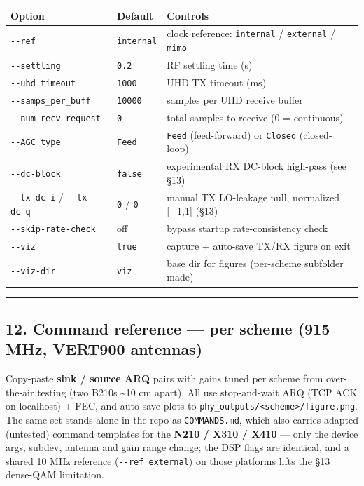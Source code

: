 \documentclass[
  10pt,
]{article}
\begin{document}
\begin{longtable}[]{@{}lll@{}}
\toprule
Option & Default & Controls \\
\midrule
\endhead
\texttt{-\/-ref} & \texttt{internal} & clock reference:
\texttt{internal} / \texttt{external} / \texttt{mimo} \\
\texttt{-\/-settling} & \texttt{0.2} & RF settling time (s) \\
\texttt{-\/-uhd\_timeout} & \texttt{1000} & UHD TX timeout (ms) \\
\texttt{-\/-samps\_per\_buff} & \texttt{10000} & samples per UHD receive
buffer \\
\texttt{-\/-num\_recv\_request} & \texttt{0} & total samples to receive
(0 = continuous) \\
\texttt{-\/-AGC\_type} & \texttt{Feed} & \texttt{Feed} (feed-forward) or
\texttt{Closed} (closed-loop) \\
\texttt{-\/-dc-block} & \texttt{false} & experimental RX DC-block
high-pass (see §13) \\
\texttt{-\/-tx-dc-i} / \texttt{-\/-tx-dc-q} & \texttt{0} / \texttt{0} &
manual TX LO-leakage null, normalized {[}−1,1{]} (§13) \\
\texttt{-\/-skip-rate-check} & off & bypass startup rate-consistency
check \\
\texttt{-\/-viz} & \texttt{true} & capture + auto-save TX/RX figure on
exit \\
\texttt{-\/-viz-dir} & \texttt{viz} & base dir for figures (per-scheme
subfolder made) \\
\bottomrule
\end{longtable}

\begin{center}\rule{0.5\linewidth}{0.5pt}\end{center}

\hypertarget{12-command-reference--per-scheme-915-mhz-vert900-antennas}{%
\subsection{12. Command reference --- per scheme (915 MHz, VERT900
antennas)}\label{12-command-reference--per-scheme-915-mhz-vert900-antennas}}

Copy-paste \textbf{sink / source ARQ} pairs with gains tuned per scheme
from over-the-air testing (two B210s \textasciitilde10 cm apart). All
use stop-and-wait ARQ (TCP ACK on localhost) + FEC, and auto-save plots
to \texttt{phy\_outputs/\textless{}scheme\textgreater{}/figure.png}. The
same set stands alone in the repo as \texttt{COMMANDS.md}, which also
carries adapted (untested) command templates for the \textbf{N210 / X310
/ X410} --- only the device args, subdev, antenna and gain range change;
the DSP flags are identical, and a shared 10 MHz reference
(\texttt{-\/-ref\ external}) on those platforms lifts the §13 dense-QAM
limitation.
\end{document}
